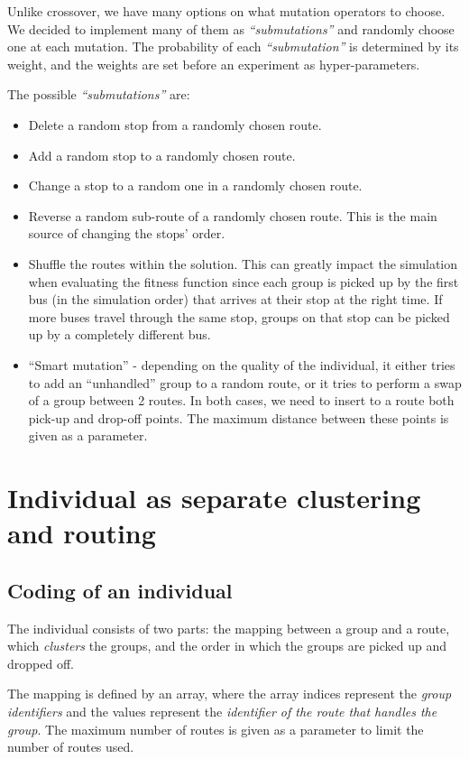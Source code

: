 Unlike crossover, we have many options on what mutation operators to choose. We decided to implement many of them as \textit{``submutations''} and randomly choose one at each mutation. The probability of each \textit{``submutation''} is determined by its weight, and the weights are set before an experiment as hyper-parameters.

The possible \textit{``submutations''} are:
\begin{itemize}
    \setlength\itemsep{0pt}
    \item Delete a random stop from a randomly chosen route.
    \item Add a random stop to a randomly chosen route.
    \item Change a stop to a random one in a randomly chosen route.
    \item Reverse a random sub-route of a randomly chosen route. This is the main source of changing the stops' order.
    \item Shuffle the routes within the solution. This can greatly impact the simulation when evaluating the fitness function since each group is picked up by the first bus (in the simulation order) that arrives at their stop at the right time. If more buses travel through the same stop, groups on that stop can be picked up by a completely different bus.
    \item ``Smart mutation'' - depending on the quality of the individual, it either tries to add an ``unhandled'' group to a random route, or it tries to perform a swap of a group between 2 routes. In both cases, we need to insert to a route both pick-up and drop-off points. The maximum distance between these points is given as a parameter.
\end{itemize}

\section{Individual as separate clustering and routing}\label{sec:evocr}

\subsection{Coding of an individual}

The individual consists of two parts: the mapping between a group and a route, which \textit{clusters} the groups, and the order in which the groups are picked up and dropped off.

The mapping is defined by an array, where the array indices represent the \textit{group identifiers} and the values represent the \textit{identifier of the route that handles the group}. The maximum number of routes is given as a parameter to limit the number of routes used.

